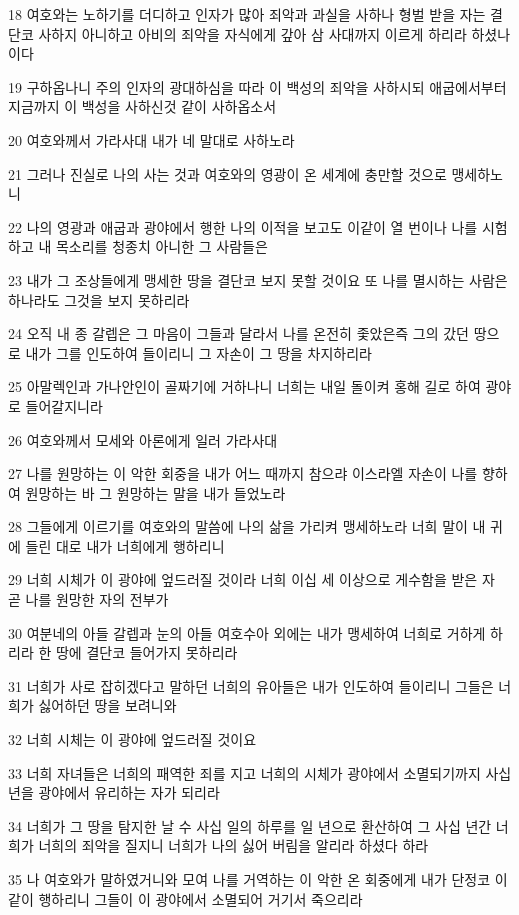 \par 18 여호와는 노하기를 더디하고 인자가 많아 죄악과 과실을 사하나 형벌 받을 자는 결단코 사하지 아니하고 아비의 죄악을 자식에게 갚아 삼 사대까지 이르게 하리라 하셨나이다
\par 19 구하옵나니 주의 인자의 광대하심을 따라 이 백성의 죄악을 사하시되 애굽에서부터 지금까지 이 백성을 사하신것 같이 사하옵소서
\par 20 여호와께서 가라사대 내가 네 말대로 사하노라
\par 21 그러나 진실로 나의 사는 것과 여호와의 영광이 온 세계에 충만할 것으로 맹세하노니
\par 22 나의 영광과 애굽과 광야에서 행한 나의 이적을 보고도 이같이 열 번이나 나를 시험하고 내 목소리를 청종치 아니한 그 사람들은
\par 23 내가 그 조상들에게 맹세한 땅을 결단코 보지 못할 것이요 또 나를 멸시하는 사람은 하나라도 그것을 보지 못하리라
\par 24 오직 내 종 갈렙은 그 마음이 그들과 달라서 나를 온전히 좇았은즉 그의 갔던 땅으로 내가 그를 인도하여 들이리니 그 자손이 그 땅을 차지하리라
\par 25 아말렉인과 가나안인이 골짜기에 거하나니 너희는 내일 돌이켜 홍해 길로 하여 광야로 들어갈지니라
\par 26 여호와께서 모세와 아론에게 일러 가라사대
\par 27 나를 원망하는 이 악한 회중을 내가 어느 때까지 참으랴 이스라엘 자손이 나를 향하여 원망하는 바 그 원망하는 말을 내가 들었노라
\par 28 그들에게 이르기를 여호와의 말씀에 나의 삶을 가리켜 맹세하노라 너희 말이 내 귀에 들린 대로 내가 너희에게 행하리니
\par 29 너희 시체가 이 광야에 엎드러질 것이라 너희 이십 세 이상으로 게수함을 받은 자 곧 나를 원망한 자의 전부가
\par 30 여분네의 아들 갈렙과 눈의 아들 여호수아 외에는 내가 맹세하여 너희로 거하게 하리라 한 땅에 결단코 들어가지 못하리라
\par 31 너희가 사로 잡히겠다고 말하던 너희의 유아들은 내가 인도하여 들이리니 그들은 너희가 싫어하던 땅을 보려니와
\par 32 너희 시체는 이 광야에 엎드러질 것이요
\par 33 너희 자녀들은 너희의 패역한 죄를 지고 너희의 시체가 광야에서 소멸되기까지 사십 년을 광야에서 유리하는 자가 되리라
\par 34 너희가 그 땅을 탐지한 날 수 사십 일의 하루를 일 년으로 환산하여 그 사십 년간 너희가 너희의 죄악을 질지니 너희가 나의 싫어 버림을 알리라 하셨다 하라
\par 35 나 여호와가 말하였거니와 모여 나를 거역하는 이 악한 온 회중에게 내가 단정코 이같이 행하리니 그들이 이 광야에서 소멸되어 거기서 죽으리라

